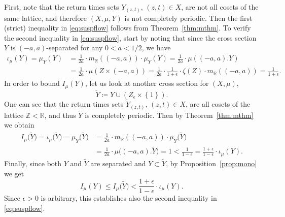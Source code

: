 \documentclass{amsart}
\numberwithin{equation}{subsection}
\theoremstyle{remark}
\begin{document}
First, note that the return times sets \(Y_{\left(z,t\right)}\), \(\left(z,t\right)\in X\), are not all cosets of the same lattice, and therefore \(\left(X,\mu,Y\right)\) is not completely periodic. Then the first (strict) inequality in \eqref{eq:suspflow} follows from Theorem~\ref{thm:mthm}. To verify the second inequality in \eqref{eq:suspflow}, start by noting that since the cross section \(Y\) is \(\left(-a,a\right)\)-separated for any \(0<a<1/2\), we have
\begin{align*}
\iota_{\mu}\left(Y\right)=\mu_{Y}\left(Y\right)
&=\frac{1}{2a}\cdot m_{\mathbb{R}}\left(\left(-a,a\right)\right)\cdot\mu_{Y}\left(Y\right)=\frac{1}{2a}\cdot\mu\left(\left(-a,a\right).Y\right)\\
&=\frac{1}{2a}\cdot\mu\left(Z\times\left(-a,a\right)\right)=\frac{1}{2a}\cdot\frac{1}{1+\epsilon}\cdot\zeta\left(Z\right)\cdot m_{\mathbb{R}}\left(\left(-a,a\right)\right)=\frac{1}{1+\epsilon}.
\end{align*}
In order to bound \(I_{\mu}\left(Y\right)\), let us look at another cross section for \(\left(X,\mu\right)\),
\[\widetilde{Y}\coloneqq Y\cup\left(Z_{\epsilon}\times\left\{ 1\right\} \right).\]
One can see that  the return times sets \(\widetilde{Y}_{\left(z,t\right)}\), \(\left(z,t\right)\in X\), are all cosets of the lattice \(\mathbb{Z}<\mathbb{R}\), and thus \(\widetilde{Y}\) is completely periodic. Then by Theorem~\ref{thm:mthm} we obtain
\begin{align*}
I_{\mu}\big(\widetilde{Y}\big)=\iota_{\mu}\big(\widetilde{Y}\big)=\mu_{\widetilde{Y}}\big(\widetilde{Y}\big)
&=\frac{1}{2a}\cdot m_{\mathbb{R}}\left(\left(-a,a\right)\right)\cdot\mu_{\widetilde{Y}}\big(\widetilde{Y}\big)\\
&=\frac{1}{2a}\cdot\mu\big(\left(-a,a\right).\widetilde{Y}\big)=1<\frac{1}{1-\epsilon}=\frac{1+\epsilon}{1-\epsilon}\cdot\iota_{\mu}\left(Y\right).
\end{align*}
Finally, since both \(Y\) and \(\widetilde{Y}\) are separated and \(Y\subset\widetilde{Y}\), by Proposition~\ref{prop:mono} we get
\[I_{\mu}\left(Y\right)\leq I_{\mu}\big(\widetilde{Y}\big)<\frac{1+\epsilon}{1-\epsilon}\cdot\iota_{\mu}\left(Y\right).\]
Since \(\epsilon>0\) is arbitrary, this establishes also the second inequality in \eqref{eq:suspflow}.



\end{document}
